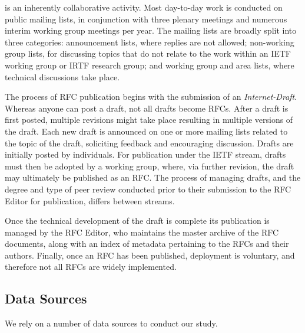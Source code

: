 \documentclass[twocolumn,10pt]{article}
\newcommand{\pb}[1]{\vspace{0.75ex}\noindent{\textbf{#1}}}
\begin{document}
\pb{The standards development process} is an inherently collaborative
activity.  Most day-to-day work is conducted on public mailing lists, in
conjunction with three plenary meetings and numerous interim working group
meetings per year. 
The mailing lists are broadly split into three categories: announcement
lists, where replies are not allowed; non-working group lists, for
discussing topics that do not relate to the work within an IETF working
group or IRTF research group; and working group and area lists, where
technical discussions take place.

The process of RFC publication begins with the submission of an
\emph{Internet-Draft}. Whereas anyone can post a draft, not all drafts
become RFCs. After a draft is first posted, multiple revisions might take
place resulting in multiple versions of the draft. Each new draft is
announced on one or more mailing lists related to the topic of the draft,
soliciting feedback and encouraging discussion. Drafts are initially posted
by individuals. For publication under the IETF stream, drafts must then be
adopted by a working group, where, via further revision, the draft may
ultimately be published as an RFC. The process of managing drafts, and the
degree and type of peer review conducted prior to their submission to the
RFC Editor for publication, differs between streams.

Once the technical development of the draft is complete its publication is
managed by the RFC Editor, who maintains the master archive of the RFC
documents, along with an index of metadata pertaining to the RFCs and their
authors. Finally, once an RFC has been published, deployment is voluntary,
and therefore not all RFCs are widely implemented.

\subsection{Data Sources}


We rely on a number of data sources to conduct our study.
\end{document}
